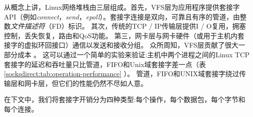 从概念上讲，Linux网络堆栈由三层组成。首先，VFS层为应用程序提供套接字API（例如\emph {connect}，\emph {send}，\emph {epoll}）。套接字连接是双向，可靠且有序的管道，由整数\emph {文件描述符}（FD）标识。
其次，传统的TCP / IP传输层提供I / O复用，拥塞控制，丢失恢复，路由和QoS功能。
第三，网卡层与网卡硬件（或用于主机内套接字的虚拟环回接口）通信以发送和接收分组。
众所周知，VFS层贡献了很大一部分成本 \cite {clark1989analysis,boyd2010analysis}。
这可以通过一个简单的实验来验证:主机中两个进程之间的Linux TCP套接字的延迟和吞吐量只比管道，FIFO和Unix域套接字差一点（表 \ref {socksdirect:tab:operation-performance} ）。
管道，FIFO和UNIX域套接字绕过传输层和网卡层，但它们的性能仍然不尽如人意。

在下文中，我们将套接字开销分为四种类型:每个操作，每个数据包，每个字节和每个连接。


